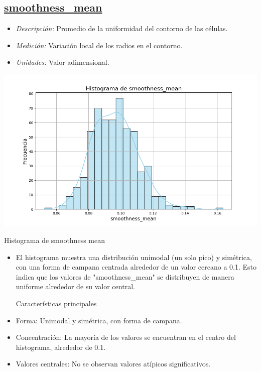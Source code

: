 \documentclass[a4paper, 12pt]{article}
\begin{document}
\subsection*{\underline{smoothness\_mean}}

 \begin{itemize}
	\item \textit{Descripción:} Promedio de la uniformidad del contorno de las células.
	\item \textit{Medición:} Variación local de los radios en el contorno.
	\item \textit{Unidades:} Valor adimensional.
\end{itemize}

\includegraphics[width=\textwidth]{../Plots/plots_stats/smoothness_mean/histograma_smoothness_mean.png}

Histograma de smoothness mean
\begin{itemize}
\item El histograma muestra una distribución unimodal (un solo pico) y simétrica, con una forma de campana centrada alrededor de un valor cercano a 0.1. Esto indica que los valores de "smoothness_mean" se distribuyen de manera uniforme alrededor de su valor central.

Características principales

\item Forma: Unimodal y simétrica, con forma de campana.
\item Concentración: La mayoría de los valores se encuentran en el centro del histograma, alrededor de 0.1.
\item Valores centrales: No se observan valores atípicos significativos.
\end{itemize}
\end{document}
